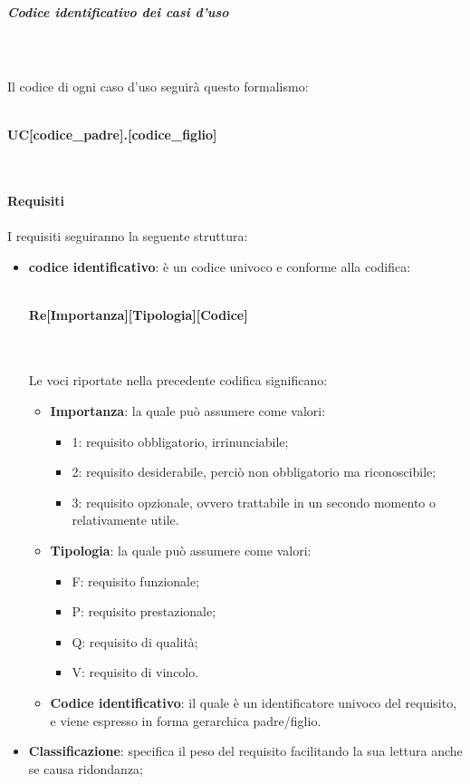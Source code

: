 				\subparagraph*{Codice identificativo dei casi d'uso} \mbox{} \\ \mbox{} \\
			Il codice di ogni caso d'uso seguirà questo formalismo: \\ \\
			\centerline{\textbf{UC[codice\_padre].[codice\_figlio]}} \\ \\
			\textbf{Requisiti} \\ \\
			I requisiti seguiranno la seguente struttura:
				\begin{itemize}
					\item \textbf{codice identificativo}: è un codice univoco e conforme alla codifica: \\ \\
					\centerline{\textbf{Re[Importanza][Tipologia][Codice]}} \\ \\
					Le voci riportate nella precedente codifica significano: 
					\begin{itemize}
						\item \textbf{Importanza}: la quale può assumere come valori:
						\begin{itemize}
							\item 1: requisito obbligatorio, irrinunciabile;
							\item 2: requisito desiderabile, perciò non obbligatorio ma riconoscibile;
							\item 3: requisito opzionale, ovvero trattabile in un secondo momento o relativamente utile.
						\end{itemize}
						\item \textbf{Tipologia}: la quale può assumere come valori:
						\begin{itemize}
							\item F: requisito funzionale;
							\item P: requisito prestazionale;
							\item Q: requisito di qualità;
							\item V: requisito di vincolo.
						\end{itemize}
						\item \textbf{Codice identificativo}: il quale è un identificatore univoco del requisito, e viene espresso in forma gerarchica padre/figlio.
					\end{itemize}
					\item \textbf{Classificazione}: specifica il peso del requisito facilitando la sua lettura anche se causa ridondanza;

\end{itemize}

